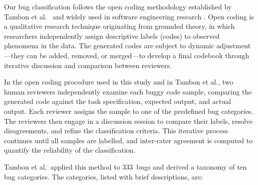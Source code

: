 \documentclass[smallextended]{svjour3}
\begin{document}
Our bug classification follows the open coding methodology established by Tambon et al.\ \citep{tambon2025bugs} and widely used in software engineering research \citep{liu2023chatgpt}. Open coding is a qualitative research technique originating from grounded theory, in which researchers independently assign descriptive labels (codes) to observed phenomena in the data. The generated codes are subject to dynamic adjustment---they can be added, removed, or merged---to develop a final codebook through iterative discussion and comparison between reviewers.

In the open coding procedure used in this study and in Tambon et al., two human reviewers independently examine each buggy code sample, comparing the generated code against the task specification, expected output, and actual output. Each reviewer assigns the sample to one of the predefined bug categories. The reviewers then engage in a discussion session to compare their labels, resolve disagreements, and refine the classification criteria. This iterative process continues until all samples are labelled, and inter-rater agreement is computed to quantify the reliability of the classification.

Tambon et al.\ applied this method to 333~bugs and derived a taxonomy of ten bug categories. The categories, listed with brief descriptions, are:
\end{document}
